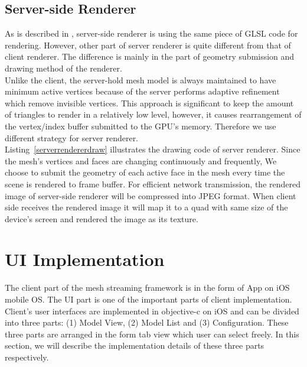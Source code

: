 \subsection{Server-side Renderer}
\label{section:serverrenderer}

As is described in , server-side renderer is using the same piece of GLSL code for rendering. However, other part of server renderer is quite different from that of client renderer. The difference is mainly in the part of geometry submission and drawing method of the renderer. \\

Unlike the client, the server-hold mesh model is always maintained to have minimum active vertices because of the server performs adaptive refinement which remove invisible vertices. This approach is significant to keep the amount of triangles to render in a relatively low level, however, it causes rearrangement of the vertex/index buffer submitted to the GPU's memory. Therefore we use different strategy for server renderer. \\

Listing~\ref{serverrendererdraw} illustrates the drawing code of server renderer. Since the mesh's vertices and faces are changing continuously and frequently, We choose to submit the geometry of each active face in the mesh every time the scene is rendered to frame buffer. For efficient network transmission, the rendered image of server-side renderer will be compressed into JPEG format. When client side receives the rendered image it will map it to a quad with same size of the device's screen and rendered the image as its texture. 

\section{UI Implementation}
\label{section:uiimpl}
The client part of the mesh streaming framework is in the form of App on iOS mobile OS. The UI part is one of the important parts of client implementation. Client's user interfaces are implemented in objective-c on iOS and can be divided into three parts: (1) Model View, (2) Model List and (3) Configuration. These three parts are arranged in the form tab view which user can select freely. In this section, we will describe the implementation details of these three parts respectively. 

